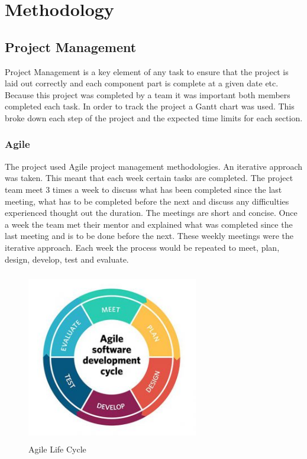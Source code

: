\chapter{Methodology}
\section{Project Management}

Project Management is a key element of any task to ensure that the project is laid out correctly and each component part is complete at a given date etc. Because this project was completed by a team it was important both members completed each task. In order to track the project a Gantt chart was used. This broke down each step of the project and the expected time limits for each section.

\subsection{Agile}

The project used Agile project management methodologies. An iterative approach was taken. This meant that each week certain tasks are completed. The project team meet 3 times a week to discuss what has been completed since the last meeting, what has to be completed before the next and discuss any difficulties experienced thought out the duration. The meetings are short and concise. Once a week the team met their mentor and explained what was completed since the last meeting and is to be done before the next. These weekly meetings were the iterative approach. Each week the process would be repeated to meet, plan, design, develop, test and evaluate.

\begin{figure}[ht!]
    \centering
 \includegraphics[width=75mm, height=75mm,scale=0.5]{img/agile.jpg}
\caption{Agile Life Cycle}
\label{fig:agile}
\end{figure}

